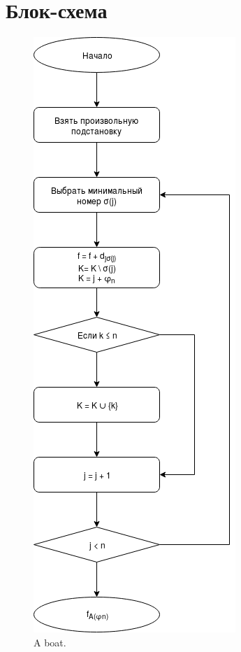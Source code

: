\section{Блок-схема}

\begin{figure}[hp!]
  \includegraphics[width=\linewidth, height=\textheight,keepaspectratio]{Chapters/image/flowchart.png}
  \caption{A boat.}
  \label{fig:flowchart}
\end{figure}


